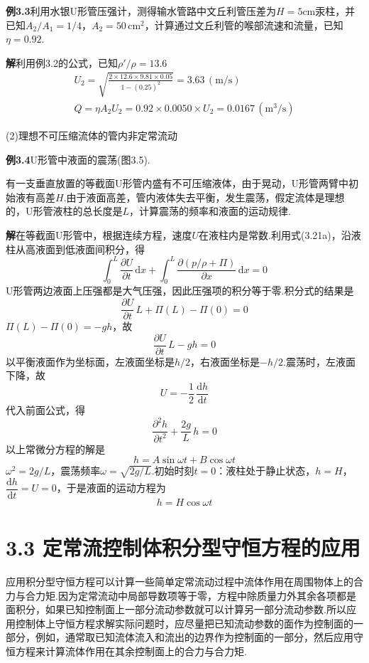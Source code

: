 \noindent\textbf{例3.3}\quad 利用水银U形管压强计，测得输水管路中文丘利管压差为$H=5$cm汞柱，并已知$A_2/A_1=1/4$，$A_2=50\,\mathrm{cm^2}$，计算通过文丘利管的喉部流速和流量，已知$\eta=0.92$.

\noindent\textbf{解}\quad 利用例3.2的公式，已知$\rho'/\rho=13.6$
\begin{gather*}
U_2=\sqrt{\frac{2\times 12.6\times 9.81\times 0.05}{1-(0.25)^{2}}}=3.63\,(\mathrm{m/s})\\[4pt]
Q=\eta A_2U_2=0.92\times 0.0050\times U_2=0.0167\,(\mathrm{m^3/s})
\end{gather*}

(2)理想不可压缩流体的管内非定常流动

\noindent\textbf{例3.4}\quad U形管中液面的震荡(图3.5).

有一支垂直放置的等截面U形管内盛有不可压缩液体，由于晃动，U形管两臂中初始液有高差$H$.由于液面高差，管内液体失去平衡，发生震荡，假定流体是理想的，U形管液柱的总长度是$L$，计算震荡的频率和液面的运动规律.

\noindent\textbf{解}\quad 在等截面U形管中，根据连续方程，速度$U$在液柱内是常数.利用式(3.21a)，沿液柱从高液面到低液面间积分，得
\[
\int_0^{L}\frac{\partial U}{\partial t}\,\mathrm{d}x+\int_0^{L}\frac{\partial(p/\rho+\Pi)}{\partial x}\,\mathrm{d}x=0
\]
U形管两边液面上压强都是大气压强，因此压强项的积分等于零.积分式的结果是
\[
\frac{\partial U}{\partial t}\,L+\Pi(L)-\Pi(0)=0
\]
$\Pi(L)-\Pi(0)=-gh$，故
\[
\frac{\partial U}{\partial t}\,L-gh=0
\]
以平衡液面作为坐标面，左液面坐标是$h/2$，右液面坐标是$-h/2$.震荡时，左液面下降，故
\[
U=-\frac{1}{2}\,\frac{\mathrm{d}h}{\mathrm{d}t}
\]
代入前面公式，得
\[
\frac{\partial^{2}h}{\partial t^{2}}+\frac{2g}{L}\,h=0
\]
以上常微分方程的解是
\[
h=A\sin\omega t+B\cos\omega t
\]
$\omega^{2}=2g/L$，震荡频率$\omega=\sqrt{2g/L}$.初始时刻$t=0$：液柱处于静止状态，$h=H$，$\dfrac{\mathrm{d}h}{\mathrm{d}t}=U=0$，于是液面的运动方程为
\[
h=H\cos\omega t
\]

\section*{3.3  定常流控制体积分型守恒方程的应用}

应用积分型守恒方程可以计算一些简单定常流动过程中流体作用在周围物体上的合力与合力矩.因为定常流动中局部导数项等于零，方程中除质量力外其余各项都是面积分，如果已知控制面上一部分流动参数就可以计算另一部分流动参数.所以应用控制体上守恒方程求解实际问题时，应尽量把已知流动参数的面作为控制面的一部分，例如，通常取已知流体流入和流出的边界作为控制面的一部分，然后应用守恒方程来计算流体作用在其余控制面上的合力与合力矩.

